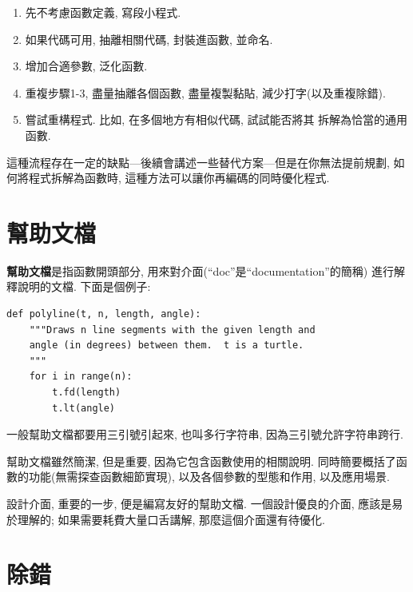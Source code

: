 \documentclass[10pt]{book}
\begin{document}
\begin{enumerate}

\item 先不考慮函數定義, 寫段小程式.

\item 如果代碼可用, 抽離相關代碼, 封裝進函數, 並命名.

\item 增加合適參數, 泛化函數.

\item 重複步驟1-3, 盡量抽離各個函數, 盡量複製黏貼, 減少打字(以及重複除錯).

\item 嘗試重構程式. 比如, 在多個地方有相似代碼, 試試能否將其
拆解為恰當的通用函數.

\end{enumerate}

這種流程存在一定的缺點---後續會講述一些替代方案---但是在你無法提前規劃, 
如何將程式拆解為函數時, 這種方法可以讓你再編碼的同時優化程式. 

\section{幫助文檔}
\label{docstring}
{\bf 幫助文檔}是指函數開頭部分, 用來對介面(``doc''是``documentation''的簡稱)
進行解釋說明的文檔. 下面是個例子:

\begin{verbatim}
def polyline(t, n, length, angle):
    """Draws n line segments with the given length and
    angle (in degrees) between them.  t is a turtle.
    """    
    for i in range(n):
        t.fd(length)
        t.lt(angle)
\end{verbatim}
%
一般幫助文檔都要用三引號引起來, 也叫多行字符串, 
因為三引號允許字符串跨行. 

幫助文檔雖然簡潔, 但是重要, 因為它包含函數使用的相關說明. 
同時簡要概括了函數的功能(無需探查函數細節實現), 
以及各個參數的型態和作用, 以及應用場景. 

設計介面, 重要的一步, 便是編寫友好的幫助文檔. 
一個設計優良的介面, 應該是易於理解的;
如果需要耗費大量口舌講解, 那麼這個介面還有待優化. 


\section{除錯}
\end{document}
